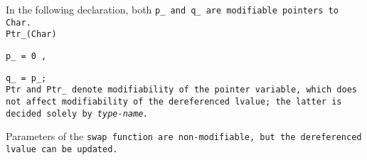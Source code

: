 \example In the following declaration,
both \tt{p_} and \tt{q_} are modifiable pointers to \tt{Char}.\\

\tt{Ptr_(Char)}

\tt{p_ = 0 ,}

\tt{q_ = p_;}\\

\note \tt{Ptr} and \tt{Ptr_} denote modifiability of the pointer variable,
which does not affect modifiability of the dereferenced lvalue;
the latter is decided solely by \it{type-name}.

\example Parameters of the \tt{swap} function are non-modifiable,
but the dereferenced lvalue can be updated.

